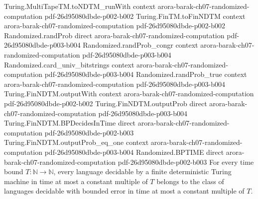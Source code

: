 \begin{theorem}
\proofstep
  {Turing.MultiTapeTM.toNDTM_runWith}
  {context}
  {arora-barak-ch07-randomized-computation}
  {pdf-26d95080dbde-p002-b002}
\proofstep
  {Turing.FinTM.toFinNDTM}
  {context}
  {arora-barak-ch07-randomized-computation}
  {pdf-26d95080dbde-p002-b002}
\proofstep
  {Randomized.randProb}
  {direct}
  {arora-barak-ch07-randomized-computation}
  {pdf-26d95080dbde-p003-b004}
\proofstep
  {Randomized.randProb_congr}
  {context}
  {arora-barak-ch07-randomized-computation}
  {pdf-26d95080dbde-p003-b004}
\proofstep
  {Randomized.card_univ_bitstrings}
  {context}
  {arora-barak-ch07-randomized-computation}
  {pdf-26d95080dbde-p003-b004}
\proofstep
  {Randomized.randProb_true}
  {context}
  {arora-barak-ch07-randomized-computation}
  {pdf-26d95080dbde-p003-b004}
\proofstep
  {Turing.FinNDTM.outputWith}
  {context}
  {arora-barak-ch07-randomized-computation}
  {pdf-26d95080dbde-p002-b002}
\proofstep
  {Turing.FinNDTM.outputProb}
  {direct}
  {arora-barak-ch07-randomized-computation}
  {pdf-26d95080dbde-p003-b004}
\proofstep
  {Turing.FinNDTM.BPDecidesInTime}
  {direct}
  {arora-barak-ch07-randomized-computation}
  {pdf-26d95080dbde-p002-b003}
\proofstep
  {Turing.FinNDTM.outputProb_eq_one}
  {context}
  {arora-barak-ch07-randomized-computation}
  {pdf-26d95080dbde-p003-b004}
\proofstep
  {Randomized.BPTIME}
  {direct}
  {arora-barak-ch07-randomized-computation}
  {pdf-26d95080dbde-p002-b003}
For every time bound $T\colon\mathbb{N}\to\mathbb{N}$, every language decidable by a
finite deterministic Turing machine in time at most a constant multiple of $T$ belongs
to the class of languages decidable with bounded error in time at most a constant
multiple of $T$.
\end{theorem}

